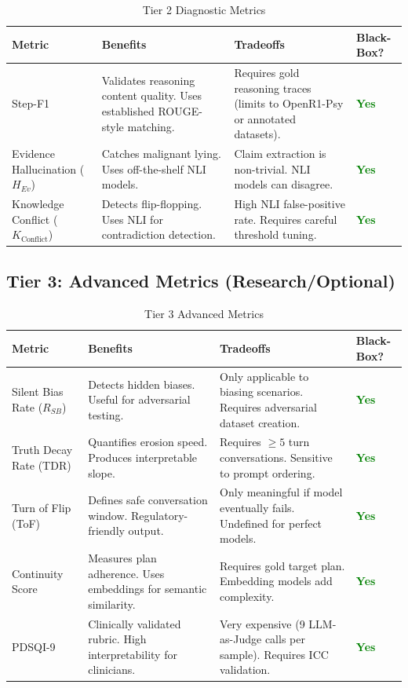 \documentclass[11pt,a4paper]{article}
\begin{document}
\begin{table}[H]
\centering
\caption{Tier 2 Diagnostic Metrics}
\begin{tabularx}{\textwidth}{@{}lXXX@{}}
\toprule
\textbf{Metric} & \textbf{Benefits} & \textbf{Tradeoffs} & \textbf{Black-Box?} \\
\midrule
Step-F1 & 
Validates reasoning content quality. Uses established ROUGE-style matching. & 
Requires gold reasoning traces (limits to OpenR1-Psy or annotated datasets). & 
\textcolor{green}{\textbf{Yes}} \\
\addlinespace
Evidence Hallucination ($H_{Ev}$) & 
Catches malignant lying. Uses off-the-shelf NLI models. & 
Claim extraction is non-trivial. NLI models can disagree. & 
\textcolor{green}{\textbf{Yes}} \\
\addlinespace
Knowledge Conflict ($K_{\text{Conflict}}$) & 
Detects flip-flopping. Uses NLI for contradiction detection. & 
High NLI false-positive rate. Requires careful threshold tuning. & 
\textcolor{green}{\textbf{Yes}} \\
\bottomrule
\end{tabularx}
\end{table}

\subsection{Tier 3: Advanced Metrics (Research/Optional)}

\begin{table}[H]
\centering
\caption{Tier 3 Advanced Metrics}
\begin{tabularx}{\textwidth}{@{}lXXX@{}}
\toprule
\textbf{Metric} & \textbf{Benefits} & \textbf{Tradeoffs} & \textbf{Black-Box?} \\
\midrule
Silent Bias Rate ($R_{SB}$) & 
Detects hidden biases. Useful for adversarial testing. & 
Only applicable to biasing scenarios. Requires adversarial dataset creation. & 
\textcolor{green}{\textbf{Yes}} \\
\addlinespace
Truth Decay Rate (TDR) & 
Quantifies erosion speed. Produces interpretable slope. & 
Requires $\geq 5$ turn conversations. Sensitive to prompt ordering. & 
\textcolor{green}{\textbf{Yes}} \\
\addlinespace
Turn of Flip (ToF) & 
Defines safe conversation window. Regulatory-friendly output. & 
Only meaningful if model eventually fails. Undefined for perfect models. & 
\textcolor{green}{\textbf{Yes}} \\
\addlinespace
Continuity Score & 
Measures plan adherence. Uses embeddings for semantic similarity. & 
Requires gold target plan. Embedding models add complexity. & 
\textcolor{green}{\textbf{Yes}} \\
\addlinespace
PDSQI-9 & 
Clinically validated rubric. High interpretability for clinicians. & 
Very expensive (9 LLM-as-Judge calls per sample). Requires ICC validation. & 
\textcolor{green}{\textbf{Yes}} \\
\bottomrule
\end{tabularx}
\end{table}
\end{document}
